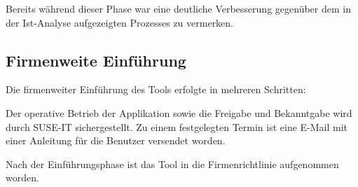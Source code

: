 Bereits während dieser Phase war eine deutliche Verbesserung gegenüber dem in der Ist-Analyse
aufgezeigten Prozesses zu vermerken.

\subsection{Firmenweite Einführung}
\label{Firmenweite Einführung}
Die firmenweiter Einführung des Tools erfolgte in mehreren Schritten:

Der operative Betrieb der Applikation sowie die Freigabe und Bekanntgabe wird durch SUSE-IT
sichergestellt.
Zu einem festgelegten Termin ist eine E-Mail mit einer Anleitung für die Benutzer versendet worden.

Nach der Einführungsphase ist das Tool in die Firmenrichtlinie 
aufgenommen worden.
